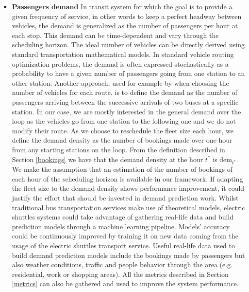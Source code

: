 \documentclass[12pt,a4paper]{article}
\begin{document}
\begin{itemize}
\setlength\itemsep{1pt}
\item \textbf{Passengers demand} In transit system for which the goal is to provide a given frequency of service, in other words to keep a perfect headway between vehicles, the demand is generalized as the number of passengers per hour at each stop. This demand can be time-dependent and vary through the scheduling horizon. The ideal number of vehicles can be directly derived using standard transportation mathematical models. In standard vehicle routing optimization problems, the demand is often expressed stochastically as a probability to have a given number of passengers going from one station to an other station. Another approach, used for example by \cite{ga} when choosing the number of vehicles for each route, is to define the demand as the number of passengers arriving between the successive arrivals of two buses at a specific station. In our case, we are mostly interested in the general demand over the loop as the vehicles go from one station to the following one and we do not modify their route. As we choose to reschedule the fleet size each hour, we define the demand density as the number of bookings made over one hour from any starting stations on the loop. From the definition described in Section \ref{bookings} we have that the demand density at the hour $t^{*}$ is $\text{dem}_{t^{*}}$. We make the assumption that an estimation of the number of bookings of each hour of the scheduling horizon is available in our framework. If adapting the fleet size to the demand density shows performance improvement, it could justify the effort that should be invested in demand prediction work. Whilst traditional bus transportation services make use of theoretical models, electric shuttles systems could take advantage of gathering real-life data and build prediction models through a machine learning pipeline. Models' accuracy could be continuously improved by training it on new data coming from the usage of the electric shuttles transport service. Useful real-life data used to build demand prediction models include the bookings made by passengers but also weather conditions, traffic and people behavior through the area (e.g. residential, work or shopping areas). All the metrics described in Section \ref{metrics} can also be gathered and used to improve the system performance.

\end{itemize}
\end{document}
